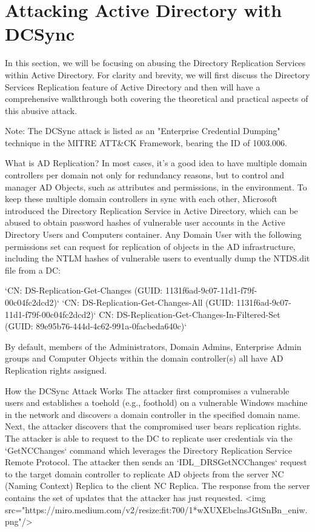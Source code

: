 \chapter{Attacking Active Directory with DCSync}

In this section, we will be focusing on abusing the Directory Replication Services within Active Directory. For clarity and brevity, we will first discuss the Directory Services Replication feature of Active Directory and then will have a comprehensive walkthrough both covering the theoretical and practical aspects of this abusive attack.

Note: The DCSync attack is listed as an "Enterprise Credential Dumping" technique in the MITRE ATT\&CK Framework, bearing the ID of 1003.006.

What is AD Replication?
In most cases, it's a good idea to have multiple domain controllers per domain not only for redundancy reasons, but to control and manager AD Objects, such as attributes and permissions, in the environment. To keep these multiple domain controllers in sync with each other, Microsoft introduced the Directory Replication Service in Active Directory, which can be abused to obtain password hashes of vulnerable user accounts in the Active Directory Users and Computers container.
Any Domain User with the following permissions set can request for replication of objects in the AD infrastructure, including the NTLM hashes of vulnerable users to eventually dump the NTDS.dit file from a DC:

`CN: DS-Replication-Get-Changes (GUID: 1131f6ad-9c07-11d1-f79f-00c04fc2dcd2)`
`CN: DS-Replication-Get-Changes-All (GUID: 1131f6ad-9c07-11d1-f79f-00c04fc2dcd2)`
CN: DS-Replication-Get-Changes-In-Filtered-Set (GUID: 89e95b76-444d-4c62-991a-0facbeda640c)`

By default, members of the Administrators, Domain Admins, Enterprise Admin groups and Computer Objects within the domain controller(s) all have AD Replication rights assigned.

How the DCSync Attack Works
The attacker first compromises a vulnerable users and establishes a toehold (e.g., foothold) on a vulnerable Windows machine in the network and discovers a domain controller in the specified domain name. Next, the attacker discovers that the compromised user bears replication rights. The attacker is able to request to the DC to replicate user credentials via the `GetNCChanges` command which leverages the Directory Replication Service Remote Protocol. The attacker then sends an `IDL\_DRSGetNCChanges` request to the target domain controller to replicate AD objects from the server NC (Naming  Context) Replica to the client NC Replica. The response from the server contains the set of updates that the attacker has just requested.
<img src="https://miro.medium.com/v2/resize:fit:700/1*wXUXEbclnsJGtSnBn\_eniw.png"/>

